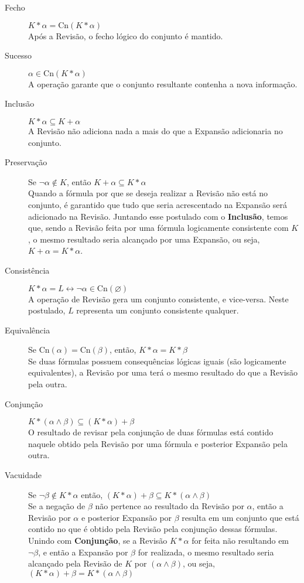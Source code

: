 \begin{description}
	\item[Fecho] $ K \ast \alpha = \text{Cn}(K \ast \alpha) $ \\ Após a Revisão, o fecho lógico do conjunto é mantido.
	\item[Sucesso] $ \alpha \in \text{Cn}(K \ast \alpha) $ \\ A operação garante que o conjunto resultante contenha a nova informação.
	\item[Inclusão] $ K \ast \alpha \subseteq K + \alpha $ \\ A Revisão não adiciona nada a mais do que a Expansão adicionaria no conjunto.
	\item[Preservação] Se $ \lnot \alpha \notin K $, então $ K + \alpha \subseteq K \ast \alpha $ \\ Quando a fórmula por que se deseja realizar a Revisão não está no conjunto, é garantido que tudo que seria acrescentado na Expansão será adicionado na Revisão. Juntando esse postulado com o \textbf{Inclusão}, temos que, sendo a Revisão feita por uma fórmula logicamente consistente com $ K $, o mesmo resultado seria alcançado por uma Expansão, ou seja, $ K + \alpha = K \ast \alpha $. 
	\item[Consistência] $ K \ast \alpha = L \leftrightarrow \lnot \alpha \in \text{Cn}(\varnothing)$ \\ A operação de Revisão gera um conjunto consistente, e vice-versa. Neste postulado, $ L $ representa um conjunto consistente qualquer.
	\item[Equivalência] Se $ \text{Cn}(\alpha) = \text{Cn}(\beta) $, então, $ K \ast \alpha = K \ast \beta $ \\ Se duas fórmulas possuem consequências lógicas iguais (são logicamente equivalentes), a Revisão por uma terá o mesmo resultado do que a Revisão pela outra.
	\item[Conjunção] $ K \ast (\alpha \land \beta) \subseteq (K \ast \alpha) + \beta $ \\ O resultado de revisar pela conjunção de duas fórmulas está contido naquele obtido pela Revisão por uma fórmula e posterior Expansão pela outra.
	\item[Vacuidade] Se $ \lnot \beta \notin K \ast \alpha $ então, $ (K \ast \alpha) + \beta \subseteq K \ast (\alpha \land \beta) $ \\ Se a negação de $ \beta $ não pertence ao resultado da Revisão por $ \alpha $, então a Revisão por $ \alpha $ e posterior Expansão por $ \beta $ resulta em um conjunto que está contido no que é obtido pela Revisão pela conjunção dessas fórmulas. Unindo com \textbf{Conjunção}, se a Revisão $ K \ast \alpha $ for feita não resultando em $ \lnot \beta $, e então a Expansão por $ \beta $ for realizada, o mesmo resultado seria alcançado pela Revisão de $ K $ por $ (\alpha \land \beta) $, ou seja, $ (K \ast \alpha) + \beta = K \ast (\alpha \land \beta) $    
\end{description}

